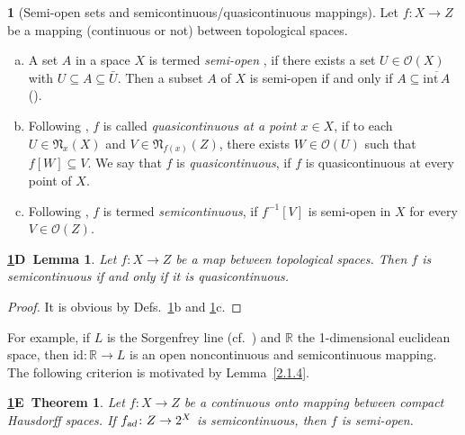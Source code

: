 \documentclass[12pt,final,3p,times]{elsarticle}
\newtheorem*{2.2.2D}{\ref{2.2.2}D~Lemma}
\newtheorem*{2.2.2E}{\ref{2.2.2}E~Theorem}
\theoremstyle{definition}
\newtheorem{sse}[sthm]{}
\numberwithin{equation}{section}
\begin{document}
\begin{sse}[Semi-open sets and semicontinuous/quasicontinuous mappings]\label{2.2.2}
Let $f\colon X\rightarrow Z$ be a mapping (continuous or not) between topological spaces. 
\begin{enumerate}[a.]
\item[\textbf{a.}] A set $A$ in a space $X$ is termed \textit{semi-open} \cite[Def.~1]{L63}, if there exists a set $U\in\mathscr{O}(X)$ with $U\subseteq A\subseteq\bar{U}$. Then a subset $A$ of $X$ is semi-open if and only if $A\subseteq\overline{\mathrm{int}\,A}$ 
(\cite[Thm.~1]{L63}).

\item[\textbf{b.}] Following \cite{K32, B52, HT}, $f$ is called \textit{quasicontinuous at a point $x\in X$}, if to each $U\in\mathfrak{N}_{x}(X)$ and $V\in\mathfrak{N}_{f(x)}(Z)$, there exists $W\in\mathscr{O}(U)$ such that $f[W]\subseteq V$. We say that $f$ is \textit{quasicontinuous}, if $f$ is quasicontinuous at every point of $X$.

\item[\textbf{c.}] Following \cite[Def.~4]{L63}, $f$ is termed \textit{semicontinuous}, if $f^{-1}[V]$ is semi-open in $X$ for every $V\in\mathscr{O}(Z)$.
\end{enumerate}

\begin{2.2.2D}
Let $f\colon X\rightarrow Z$ be a map between topological spaces. Then $f$ is semicontinuous if and only if it is quasicontinuous.
\end{2.2.2D}

\begin{proof}
    It is obvious by Defs.~\ref{2.2.2}b and \ref{2.2.2}c. 
\end{proof}

For example, if $L$ is the Sorgenfrey line (cf.~\cite[$\S$5.3, Ex.~1]{W70}) and $\mathbb{R}$ the 1-dimensional euclidean space, then $\textrm{id}\colon\mathbb{R}\rightarrow L$ is an open noncontinuous and semicontinuous mapping. The following criterion is motivated by Lemma~\ref{2.1.4}.

\begin{2.2.2E}
Let $f\colon X\rightarrow Z$ be a continuous onto mapping between compact Hausdorff spaces. If $f_\textsl{ad}\colon Z\rightarrow 2^X$ is semicontinuous, then $f$ is semi-open.
\end{2.2.2E}


\end{sse}
\end{document}
